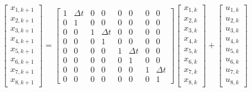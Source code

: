 \documentclass[palatino]{ist-report}
\begin{document}
\begin{align}
\begin{bmatrix} x_{1,k+1} \\ x_{2,k+1} \\ x_{3,k+1} \\ x_{4,k+1}\\ x_{5,k+1}\\ x_{6,k+1} \\ x_{7,k+1} \\ x_{8,k+1} \end{bmatrix}
= \begin{bmatrix}
1 & \Delta t & 0 & 0 & 0 & 0 & 0 & 0 \\
0 & 1 & 0 & 0 & 0 & 0 & 0 & 0 \\
0 & 0 & 1 & \Delta t & 0 & 0 & 0 & 0 \\
0 & 0 & 0 & 1 & 0 & 0 & 0 & 0 \\
0 & 0 & 0 & 0 & 1 & \Delta t & 0 & 0 \\
0 & 0 & 0 & 0 & 0 & 1 & 0 & 0 \\
0 & 0 & 0 & 0 & 0 & 0 & 1 & \Delta t \\
0 & 0 & 0 & 0 & 0 & 0 & 0 & 1
\end{bmatrix} 
\begin{bmatrix} x_{1,k} \\ x_{2,k} \\ x_{3,k} \\ x_{4,k}\\ x_{5,k}\\ x_{6,k} \\ x_{7,k} \\ x_{8,k} \end{bmatrix} + \begin{bmatrix} u_{1,k} \\ u_{2,k} \\ u_{3,k} \\ u_{4,k}\\ u_{5,k}\\ u_{6,k} \\ u_{7,k} \\ u_{8,k} \end{bmatrix}
\end{align}
\end{document}

